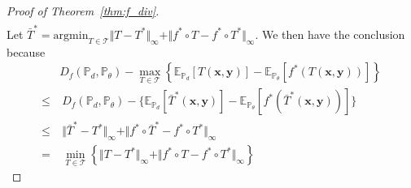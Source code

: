 \begin{proof}[Proof of Theorem~\ref{thm:f_div}]
\begin{align*}
\end{align*}
Let $\bar{T}^* = \text{argmin}_{T\in \mathcal{T}} {\Vert T-T^{*}\Vert_{\infty}+\Vert f^{*}\circ T-f^{*}\circ T^{*}\Vert_{\infty}}$. We then have the conclusion because
\begin{align*}
 & D_{f}\left(\mathbb{P}_{d},\mathbb{P}_{\theta}\right)-\max_{T\in\mathcal{T}}\left\{ \mathbb{E}_{\mathbb{P}_{d}}\left[T\left(\boldsymbol{x},\boldsymbol{y}\right)\right]-\mathbb{E}_{\mathbb{P}_{\theta}}\left[f^{*}\left(T\left(\boldsymbol{x},\boldsymbol{y}\right)\right)\right]\right\} \\
\leq & \ D_{f}\left(\mathbb{P}_{d},\mathbb{P}_{\theta}\right)-\{\mathbb{E}_{\mathbb{P}_{d}}\left[\bar{T}^{*}\left(\boldsymbol{x},\boldsymbol{y}\right)\right]-\mathbb{E}_{\mathbb{P}_{\theta}}\left[f^{*}\left(\bar{T}^{*}\left(\boldsymbol{x},\boldsymbol{y}\right)\right)\right]\}\\
\leq & \ \Vert\bar{T}^{*}-T^{*}\Vert_{\infty}+\Vert f^{*}\circ\bar{T}^{*}-f^{*}\circ T^{*}\Vert_{\infty}\\
= & \ \min_{T\in\mathcal{T}}\left\{ \Vert T-T^{*}\Vert_{\infty}+\Vert f^{*}\circ T-f^{*}\circ T^{*}\Vert_{\infty}\right\}
\end{align*}
\end{proof}

